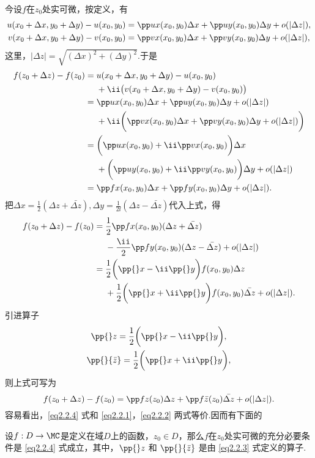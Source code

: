 今设$f$在$z_0$处实可微，按定义，有
\begin{gather}
u(x_0+\Delta x,y_0+\Delta y)-u(x_0,y_0)=\pp ux(x_0,y_0)\Delta x+\pp uy(x_0,y_0)\Delta y+o(|\Delta z|),\label{eq2.2.1}\\
v(x_0+\Delta x,y_0+\Delta y)-v(x_0,y_0)=\pp vx(x_0,y_0)\Delta x+\pp vy(x_0,y_0)\Delta y+o(|\Delta z|)\label{eq2.2.2},
\end{gather}
这里，$|\Delta z|=\sqrt{(\Delta x)^2+(\Delta y)^2}$.于是
\begin{align*}
  f(z_0+\Delta z)-f(z_0)={}&u(x_0+\Delta x,y_0+\Delta y)-u(x_0,y_0)\\
  &+  \ii\big(v(x_0+\Delta x,y_0+\Delta y)-v(x_0,y_0)\big)\\
  ={}&\pp ux(x_0,y_0)\Delta x+\pp uy(x_0,y_0)\Delta y+o(|\Delta z|)\\
  &+\ii\bigg(\pp vx(x_0,y_0)\Delta x+\pp vy(x_0,y_0)\Delta y+o(|\Delta z|)\bigg)\\
  ={}&\bigg(\pp ux(x_0,y_0)+\ii\pp vx(x_0,y_0)\bigg)\Delta x\\
  &+\bigg(\pp uy(x_0,y_0)+\ii\pp vy(x_0,y_0)\bigg)\Delta y+o(|\Delta z|)\\
  ={}&\pp fx(x_0,y_0)\Delta x+\pp fy(x_0,y_0)\Delta y+o(|\Delta z|).
\end{align*}
把$\Delta x=\frac12(\Delta z+\bar{\Delta z}),\Delta y=\frac1{2\ii}(\Delta z-\bar{\Delta z})$代入上式，得
\begin{align*}
  f(z_0+\Delta z)-f(z_0)={}&\frac12\pp fx(x_0,y_0)(\Delta z+\bar{\Delta z})\\
  &-\frac{\ii}2\pp fy(x_0,y_0)(\Delta z-\bar{\Delta z})+o(|\Delta z|)\\
  ={}&\frac12\bigg(\pp {}x-\ii\pp{}y\bigg)f(x_0,y_0)\Delta z\\
  &+\frac12\bigg(\pp{}x+\ii\pp{}y\bigg)f(x_0,y_0)\bar{\Delta z}+o(|\Delta z|).
\end{align*}
引进算子
\begin{equation}\label{eq2.2.3}
\begin{gathered}
  \pp{}z=\frac12\bigg(\pp{}x-\ii\pp{}y\bigg),\\
  \pp{}{\bar z}=\frac12\bigg(\pp{}x+\ii\pp{}y\bigg),
\end{gathered}
\end{equation}
则上式可写为
\begin{equation}\label{eq2.2.4}
  f(z_0+\Delta z)-f(z_0)=\pp fz(z_0)\Delta z+\pp f{\bar z}(z_0)\bar{\Delta z}+o(|\Delta z|).
\end{equation}
容易看出，\eqref{eq2.2.4} 式和 \eqref{eq2.2.1}，\eqref{eq2.2.2} 两式等价.因而有下面的
\begin{prop}
设$f:D\to\MC$是定义在域$D$上的函数，$z_0\in D$，那么$f$在$z_0$处实可微的充分必要条件是  \eqref{eq2.2.4} 式成立，其中，$\pp{}z$ 和 $\pp{}{\bar z}$ 是由 \eqref{eq2.2.3} 式定义的算子.
\end{prop}

